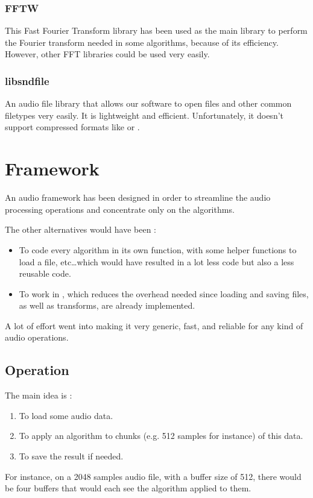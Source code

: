 \subsubsection{FFTW}
This Fast Fourier Transform library has been used as the main library to perform the Fourier transform needed in some algorithms, because of its efficiency. However, other \ac{FFT} libraries could be used very easily.
\subsubsection{libsndfile}
An audio file library that allows our software to open  files and other common filetypes very easily. It is lightweight and efficient. Unfortunately, it doesn't support compressed formats like  or . 

\section{Framework}
An audio framework has been designed in order to streamline the audio processing operations and concentrate only on the algorithms.

The other alternatives would have been :
\begin{itemize}
\item To code every algorithm in its own function, with some helper functions to load a file, etc\dots which would have resulted in a lot less code but also a less reusable code.
\item To work in , which reduces the overhead needed since loading and saving files, as well as transforms, are already implemented.
\end{itemize}

A lot of effort went into making it very generic, fast, and reliable for any kind of audio operations.


\subsection{Operation}
The main idea is : 
\begin{enumerate}
\item To load some audio data.
\item To apply an algorithm to chunks (e.g. 512 samples for instance) of this data.
\item To save the result if needed.
\end{enumerate}

For instance, on a 2048 samples audio file, with a buffer size of 512, there would be four buffers that would each see the algorithm applied to them.

